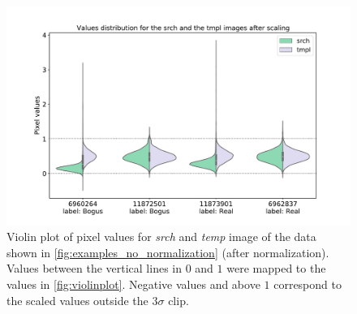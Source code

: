 \begin{figure}[h]
    \centering
    \includegraphics[width=0.6\linewidth]{
    figures/violin_plot_scaling.pdf}
    \caption{Violin plot of pixel values for \textit{srch} and \textit{temp} image of %
    the data shown in \autoref{fig:examples_no_normalization} (after normalization). Values between the vertical lines in $0$ and $1$ were mapped to the values in \autoref{fig:violinplot}. Negative values and above $1$ correspond to the scaled values outside the $3\sigma$ clip. }
    \label{fig:violinplotscaling}
\end{figure}

\clearpage



